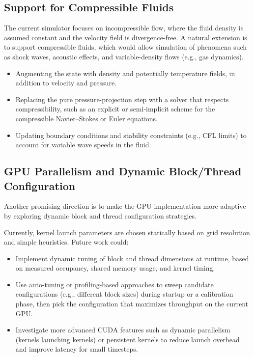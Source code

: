 \documentclass[12pt,a4paper]{article}
\begin{document}
\subsection{Support for Compressible Fluids}
The current simulator focuses on incompressible flow, where the fluid density is assumed constant and the velocity field is divergence-free. A natural extension is to support compressible fluids, which would allow simulation of phenomena such as shock waves, acoustic effects, and variable-density flows (e.g., gas dynamics).
\begin{itemize}
\item Augmenting the state with density and potentially temperature fields, in addition to velocity and pressure.
\item Replacing the pure pressure-projection step with a solver that respects compressibility, such as an explicit or semi-implicit scheme for the compressible Navier–Stokes or Euler equations.
\item Updating boundary conditions and stability constraints (e.g., CFL limits) to account for variable wave speeds in the fluid.
\end{itemize}

\subsection{GPU Parallelism and Dynamic Block/Thread Configuration}
Another promising direction is to make the GPU implementation more adaptive by exploring dynamic block and thread configuration strategies.

Currently, kernel launch parameters are chosen statically based on grid resolution and simple heuristics. Future work could:

\begin{itemize}
\item Implement dynamic tuning of block and thread dimensions at runtime, based on measured occupancy, shared memory usage, and kernel timing.
\item Use auto-tuning or profiling-based approaches to sweep candidate configurations (e.g., different block sizes) during startup or a calibration phase, then pick the configuration that maximizes throughput on the current GPU.
\item Investigate more advanced CUDA features such as dynamic parallelism (kernels launching kernels) or persistent kernels to reduce launch overhead and improve latency for small timesteps.
\end{itemize}
\end{document}
